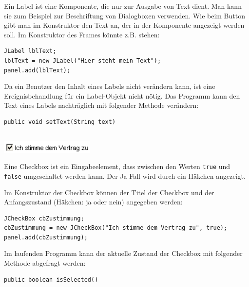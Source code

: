 Ein Label ist eine Komponente, die nur zur Ausgabe von Text dient. Man kann sie
zum Beispiel zur Beschriftung von Dialogboxen verwenden. Wie beim Button gibt
man im Konstruktor den Text an, der in der Komponente angezeigt werden soll. Im
Konstruktor des Frames könnte z.B. stehen:

\begin{lstlisting}
JLabel lblText;
lblText = new JLabel("Hier steht mein Text");
panel.add(lblText);
\end{lstlisting}

Da ein Benutzer den Inhalt eines Labels nicht verändern kann, ist eine
Ereignisbehandlung für ein Label-Objekt nicht nötig. Das Programm kann den Text
eines Labels nachträglich mit folgender Methode verändern:

\begin{lstlisting}
public void setText(String text)
\end{lstlisting}

\begin{minipage}{0.2\textwidth}
\subsection{}
\end{minipage}
\begin{minipage}{0.8\textwidth}
\includegraphics[width=0.35\textwidth]{./inf/SEKII/24_Java_GUI-Komponenten/JCheckBox.png}
\end{minipage}
		
Eine Checkbox ist ein Eingabeelement, dass zwischen den Werten \lstinline|true|
und \lstinline|false| umgeschaltet werden kann. Der Ja-Fall wird durch ein
Häkchen angezeigt.

Im Konstruktor der Checkbox können der Titel der Checkbox und der
Anfangszustand (Häkchen: ja oder nein) angegeben werden:

\begin{lstlisting}
JCheckBox cbZustimmung;
cbZustimmung = new JCheckBox("Ich stimme dem Vertrag zu", true);
panel.add(cbZustimmung);
\end{lstlisting}

Im laufenden Programm kann der aktuelle Zustand der Checkbox mit folgender
Methode abgefragt werden:

\begin{lstlisting}
public boolean isSelected()
\end{lstlisting}

